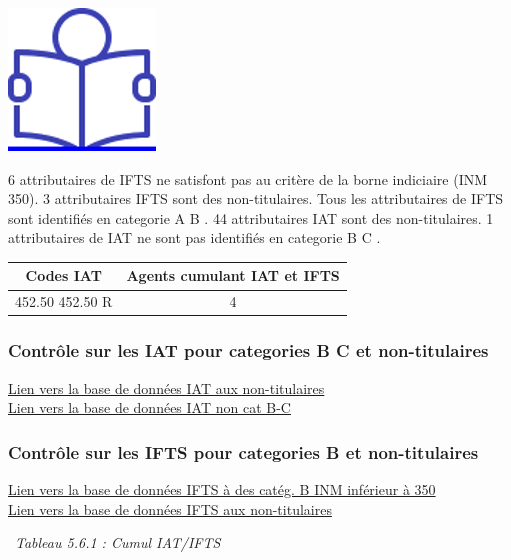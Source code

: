 \href{../Docs/Notices/fiche_IAT_IFTS.odt}{\includegraphics{icones/Notice.png}}

6 attributaires de IFTS ne satisfont pas au critère de la borne
indiciaire (INM 350). 3 attributaires IFTS sont des non-titulaires. Tous
les attributaires de IFTS sont identifiés en categorie A B . 44
attributaires IAT sont des non-titulaires. 1 attributaires de IAT ne
sont pas identifiés en categorie B C .

\begin{longtable}[]{@{}cc@{}}
\toprule
Codes IAT & Agents cumulant IAT et IFTS\tabularnewline
\midrule
\endhead
452.50 452.50 R & 4\tabularnewline
\bottomrule
\end{longtable}

\hypertarget{controle-sur-les-iat-pour-categories-b-c-et-non-titulaires}{%
\subsubsection{Contrôle sur les IAT pour categories B C et
non-titulaires}\label{controle-sur-les-iat-pour-categories-b-c-et-non-titulaires}}

\href{../Bases/Reglementation/IAT.non.tit.csv}{Lien vers la base de données
IAT aux non-titulaires}\\
\href{../Bases/Reglementation/IAT.non.catBC.csv}{Lien vers la base de
données IAT non cat B-C}

\hypertarget{controle-sur-les-ifts-pour-categories-b-et-non-titulaires}{%
\subsubsection{Contrôle sur les IFTS pour categories B et
non-titulaires}\label{controle-sur-les-ifts-pour-categories-b-et-non-titulaires}}

\href{../Bases/Reglementation/IFTS.indice.anormal.csv}{Lien vers la base de
données IFTS à des catég. B INM inférieur à 350}\\
\href{../Bases/Reglementation/IFTS.non.tit.csv}{Lien vers la base de
données IFTS aux non-titulaires}

~\emph{Tableau 5.6.1 : Cumul IAT/IFTS}

